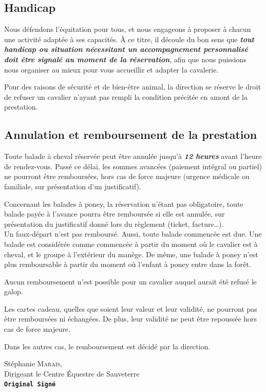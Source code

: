 \documentclass[11pt,a4paper]{article}
\renewcommand{\emph}[1]{\textit{\textbf{#1}}}
\begin{document}
   \subsection*{Handicap}
      Nous défendons l'équitation pour tous, et nous engageons à proposer à chacun une activité adaptée à ses capacités.
      À ce titre, il découle du bon sens que \emph{tout handicap ou situation nécessitant un accompagnement personnalisé doit être signalé au moment de la réservation}, afin que nous puissions nous organiser au mieux pour vous accueillir et adapter la cavalerie.

      Pour des raisons de sécurité et de bien-être animal, la direction se réserve le droit de refuser un cavalier n'ayant pas rempli la condition précitée en amont de la prestation.

   \subsection*{Annulation et remboursement de la prestation}
      Toute balade à cheval réservée peut être annulée jusqu'à \emph{12 heures} avant l'heure de rendez-vous.
      Passé ce délai, les sommes avancées (paiement intégral ou partiel) ne pourront être remboursées, hors cas de force majeure (urgence médicale ou familiale, sur présentation d'un justificatif).

      Concernant les balades à poney, la réservation n'étant pas obligatoire, toute balade payée à l'avance pourra être remboursée si elle est annulée, sur présentation du justificatif donné lors du règlement (ticket, facture\dots).
      \\

      Un faux-départ n'est pas remboursé.
      Aussi, toute balade commencée est due.
      Une balade est considérée comme \og commencée \fg{} à partir du moment où le cavalier est à cheval, et le groupe à l'extérieur du manège.
      De même, une balade à poney n'est plus remboursable à partir du moment où l'enfant à poney entre dans la forêt.

      Aucun remboursement n'est possible pour un cavalier auquel aurait été refusé le galop.

      Les cartes cadeau, quelles que soient leur valeur et leur validité, ne pourront pas être remboursées ni échangées.
      De plus, leur validité ne peut être repoussée hors cas de force majeure.

      Dans les autres cas, le remboursement est décidé par la direction.


      \vspace{3cm}

      \hspace{.55\textwidth}
      \begin{minipage}{.4\textwidth}
         \begin{center}
            Stéphanie \textsc{Marais},\\
            Dirigeant le Centre Équestre de Sauveterre\\
            \textbf{\texttt{Original Signé}}
         \end{center}
      \end{minipage}
\end{document}
